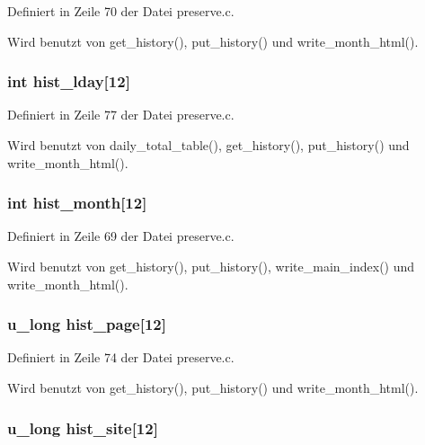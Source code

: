 Definiert in Zeile 70 der Datei preserve.c.

Wird benutzt von get\_\-history(), put\_\-history() und write\_\-month\_\-html().
\subsubsection{\setlength{\rightskip}{0pt plus 5cm}int {\bf hist\_\-lday}[12]}\label{preserve_8h_c1366de31d95191e4f8fe0894dabb4e2}




Definiert in Zeile 77 der Datei preserve.c.

Wird benutzt von daily\_\-total\_\-table(), get\_\-history(), put\_\-history() und write\_\-month\_\-html().
\subsubsection{\setlength{\rightskip}{0pt plus 5cm}int {\bf hist\_\-month}[12]}\label{preserve_8h_8dbdfde33bef98c2e3a8d2b8fab9143d}




Definiert in Zeile 69 der Datei preserve.c.

Wird benutzt von get\_\-history(), put\_\-history(), write\_\-main\_\-index() und write\_\-month\_\-html().
\subsubsection{\setlength{\rightskip}{0pt plus 5cm}u\_\-long {\bf hist\_\-page}[12]}\label{preserve_8h_6885f98057e49be4b1a58cc1fea67b11}




Definiert in Zeile 74 der Datei preserve.c.

Wird benutzt von get\_\-history(), put\_\-history() und write\_\-month\_\-html().
\subsubsection{\setlength{\rightskip}{0pt plus 5cm}u\_\-long {\bf hist\_\-site}[12]}\label{preserve_8h_95f554bfcd0bb37a1e90b29db92d2ffa}




